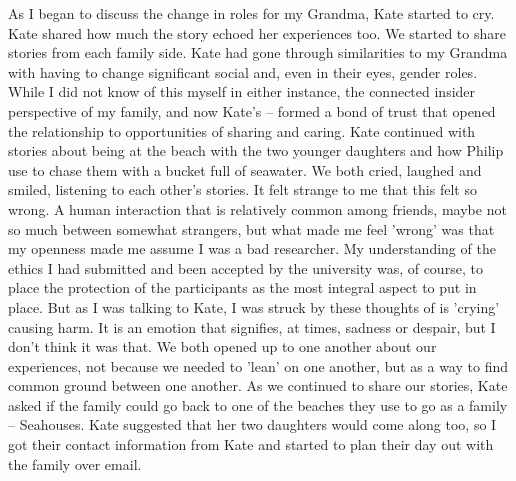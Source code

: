 As I began to discuss the change in roles for my Grandma, Kate started to cry. Kate shared how much the story echoed her experiences too. We started to share stories from each family side. Kate had gone through similarities to my Grandma with having to change significant social and, even in their eyes, gender roles. While I did not know of this myself in either instance, the connected insider perspective of my family, and now Kate's – formed a bond of trust that opened the relationship to opportunities of sharing and caring. Kate continued with stories about being at the beach with the two younger daughters and how Philip use to chase them with a bucket full of seawater. We both cried, laughed and smiled, listening to each other's stories. It felt strange to me that this felt so wrong. A human interaction that is relatively common among friends, maybe not so much between somewhat strangers, but what made me feel 'wrong' was that my openness made me assume I was a bad researcher. My understanding of the ethics I had submitted and been accepted by the university was, of course, to place the protection of the participants as the most integral aspect to put in place. But as I was talking to Kate, I was struck by these thoughts of is 'crying' causing harm. It is an emotion that signifies, at times, sadness or despair, but I don't think it was that. We both opened up to one another about our experiences, not because we needed to 'lean' on one another, but as a way to find common ground between one another. As we continued to share our stories, Kate asked if the family could go back to one of the beaches they use to go as a family – Seahouses. Kate suggested that her two daughters would come along too, so I got their contact information from Kate and started to plan their day out with the family over email.

